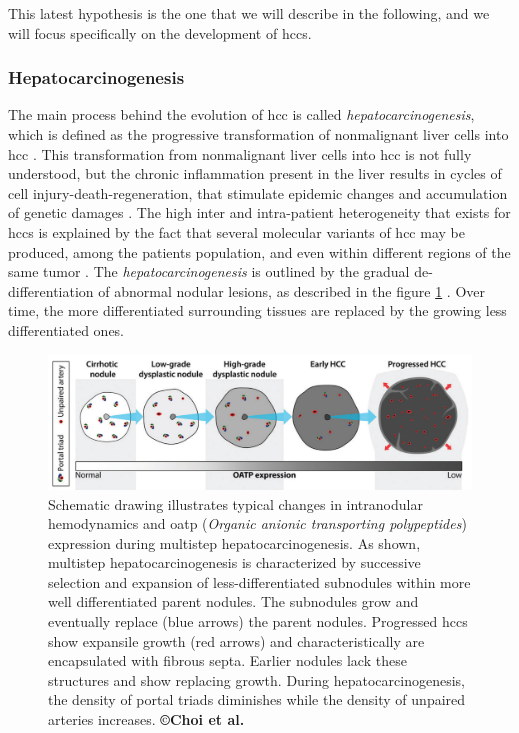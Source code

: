 This latest hypothesis is the one that we will describe in the
following, and we will focus specifically on the development of
\ac{hcc}s.

\subsubsection{Hepatocarcinogenesis}\label{hepatocarcinogenesis}

The main process behind the evolution of \ac{hcc} is called
\emph{hepatocarcinogenesis}, which is
defined as the progressive transformation of nonmalignant liver cells
into \ac{hcc} \cite{Choi2014}. 
This transformation from nonmalignant liver cells into \ac{hcc} is not
fully understood, but the chronic inflammation present in the liver
results in cycles of cell injury-death-regeneration, that stimulate
epidemic changes and accumulation of genetic damages \cite{Thorgeirsson2002,Aravalli2013,Brody2012,Trevisani2008a}. 
The high inter and intra-patient heterogeneity that exists for
\ac{hcc}s is explained by the fact that several molecular variants of
\ac{hcc} may be produced, among the patients population, and even
within different regions of the same tumor \cite{Trevisani2008a,Frenette2011}.
The \emph{hepatocarcinogenesis} is outlined by the gradual
de-differentiation of abnormal nodular lesions, as described in the
figure \ref{Choi2014_Fig1} \cite{Park2011,Frenette2011}. Over time, the more
differentiated surrounding tissues are replaced by the growing less
differentiated ones.

\begin{figure}[ht!]
\centering
\includegraphics[width=0.7\linewidth]{images/image4}
\caption{Schematic drawing illustrates typical changes in intranodular hemodynamics and \ac{oatp} (\emph{Organic anionic
  transporting polypeptides}) expression during multistep hepatocarcinogenesis. As shown, multistep hepatocarcinogenesis is characterized by successive selection and expansion of less-differentiated subnodules within more well differentiated parent nodules. The subnodules grow and eventually replace (blue arrows) the parent nodules. Progressed \ac{hcc}s show expansile growth (red arrows) and characteristically are encapsulated with fibrous septa. Earlier nodules lack these structures and show replacing growth. During hepatocarcinogenesis, the density of portal triads diminishes while the density of unpaired arteries increases. \textbf{©Choi et al. \cite{Choi2014}}}
\label{Choi2014_Fig1}
\end{figure}


